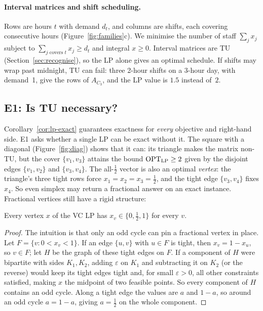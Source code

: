 \paragraph{Interval matrices and shift scheduling.} Rows are hours $t$ with demand $d_t$, and columns are shifts, each covering consecutive hours (Figure~\ref{fig:families}c). We minimise the number of staff $\sum_j x_j$ subject to $\sum_{j \text{ covers } t} x_j \ge d_t$ and integral $x\ge 0$. Interval matrices are TU (Section~\ref{sec:recognise}), so the LP alone gives an optimal schedule. If shifts may wrap past midnight, TU can fail: three 2-hour shifts on a 3-hour day, with demand~1, give the rows of $A_{C_3}$, and the LP value is $1.5$ instead of~$2$.

\subsection{E1: Is TU necessary?}\label{sec:e1}

Corollary~\ref{cor:lp-exact} guarantees exactness for \emph{every} objective and right-hand side. E1 asks whether a single LP can be exact without it. The square with a diagonal (Figure~\ref{fig:diag}) shows that it can: its triangle makes the matrix non-TU, but the cover $\{v_1,v_3\}$ attains the bound $\mathrm{OPT}_{\mathrm{LP}} \ge 2$ given by the disjoint edges $\{v_1,v_2\}$ and $\{v_3,v_4\}$. The all-$\tfrac12$ vector is also an optimal \emph{vertex}: the triangle's three tight rows force $x_1=x_2=x_3=\tfrac12$, and the tight edge $\{v_3,v_4\}$ fixes $x_4$. So even simplex may return a fractional answer on an exact instance. Fractional vertices still have a rigid structure:

\begin{lemma}\label{lem:half}
  Every vertex $x$ of the VC LP has $x_v\in\{0,\tfrac12,1\}$ for every $v$.
\end{lemma}
\begin{proof}
  The intuition is that only an odd cycle can pin a fractional vertex in place. Let $F=\{v : 0<x_v<1\}$. If an edge $\{u,v\}$ with $u\in F$ is tight, then $x_v = 1-x_u$, so $v\in F$; let $H$ be the graph of these tight edges on $F$. If a component of $H$ were bipartite with sides $K_1,K_2$, adding $\varepsilon$ on $K_1$ and subtracting it on $K_2$ (or the reverse) would keep its tight edges tight and, for small $\varepsilon>0$, all other constraints satisfied, making $x$ the midpoint of two feasible points. So every component of $H$ contains an odd cycle. Along a tight edge the values are $a$ and $1-a$, so around an odd cycle $a=1-a$, giving $a=\tfrac12$ on the whole component.
\end{proof}

